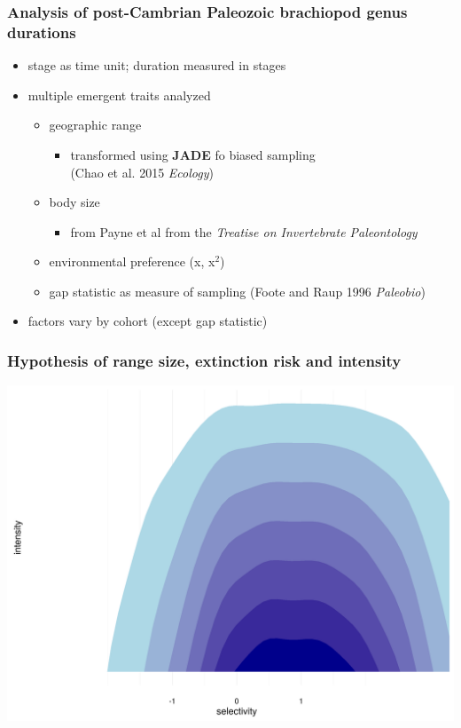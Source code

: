 \documentclass{beamer}
\begin{document}
\begin{frame}
  \frametitle{Analysis of post-Cambrian Paleozoic brachiopod genus durations}
  \begin{itemize}
    \item stage as time unit; duration measured in stages
    \item multiple emergent traits analyzed
      \begin{itemize}
        \item geographic range
          \begin{itemize}
            \item transformed using \textbf{JADE} fo biased sampling \\(Chao et al. 2015 \textit{Ecology})
          \end{itemize}
        \item body size
          \begin{itemize}
            \item from Payne et al from the \textit{Treatise on Invertebrate Paleontology}
          \end{itemize}
        \item environmental preference (x, x\(^2\))
        \item gap statistic as measure of sampling (Foote and Raup 1996 \textit{Paleobio})
      \end{itemize}
    \item factors vary by cohort (except gap statistic)
  \end{itemize}
\end{frame}


\begin{frame}
  \frametitle{Hypothesis of range size, extinction risk and intensity}
  \begin{center}
    \includegraphics[width = \textwidth,height = 0.8\textheight,keepaspectratio = true]{figure/range_hypo}
  \end{center}
\end{frame}
\end{document}
